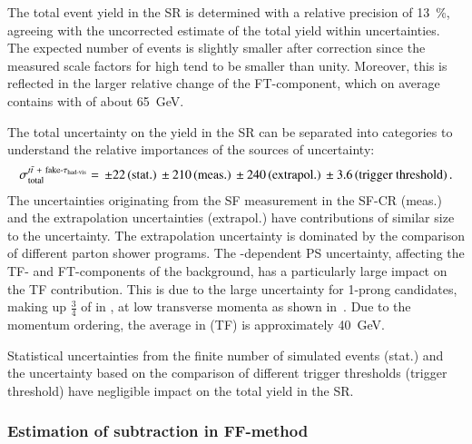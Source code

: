 The total \ttbarFakes event yield in the \hadhad SR is determined with
a relative precision of \SI{13}{\percent}, agreeing with the
uncorrected estimate of the total yield within uncertainties. The
expected number of \ttbarFakes events is slightly smaller after
correction since the measured scale factors for high \pT
\faketauhadvis tend to be smaller than unity. Moreover, this is
reflected in the larger relative change of the FT-component, which on
average contains \faketauhadvis with \pT of about \SI{65}{\GeV}.

The total uncertainty on the \ttbarFakes yield in the SR can be
separated into categories to understand the relative importances of
the sources of uncertainty:
\begin{align*}
  \sigma_\text{total}^{\ttbarFakes} = \valuesep\numerrt{22}{stat.}%
  \valuesep\numerrt{210}{meas.}%
  \valuesep\numerrt{240}{extrapol.}%
  \valuesep\numerrt{3.6}{trigger threshold} \,\text{.}
\end{align*}
The uncertainties originating from the SF measurement in the SF-CR
(meas.) and the extrapolation uncertainties (extrapol.) have
contributions of similar size to the uncertainty. The extrapolation
uncertainty is dominated by the comparison of different parton shower
programs. The \faketauhadvis \pT-dependent PS uncertainty, affecting
the TF- and FT-components of the background, has a particularly large
impact on the TF contribution. This is due to the large uncertainty
for 1-prong \faketauhadvis candidates, making up $\frac{3}{4}$ of
\faketauhadvis in \ttbar, at low transverse momenta as shown
in~. Due to the momentum ordering,
the average \faketauhadvis \pT in \ttbarFakes (TF) is approximately
\SI{40}{\GeV}.

Statistical uncertainties from the finite number of simulated events
(stat.) and the uncertainty based on the comparison of different
trigger thresholds (trigger threshold) have negligible impact on the
total yield in the \hadhad SR.





\subsubsection{Estimation of \ttbarFakes subtraction in FF-method}

